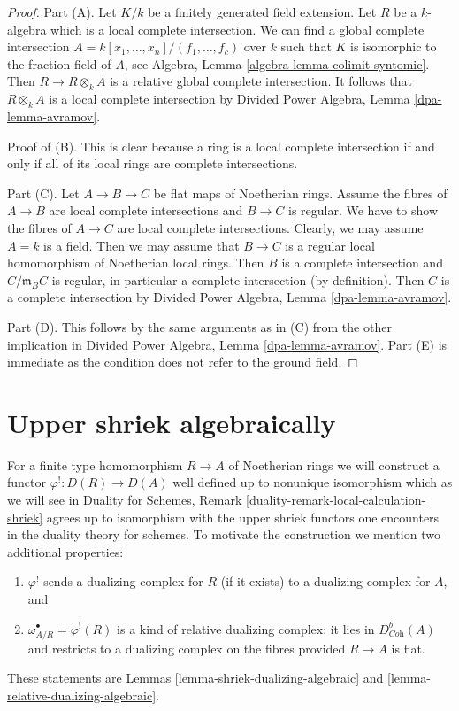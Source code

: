 \documentclass{stacks-project}
\theoremstyle{plain}
\theoremstyle{definition}
\theoremstyle{remark}
\numberwithin{equation}{subsection}
\begin{document}
\begin{proof}
Part (A). Let $K/k$ be a finitely generated field extension.
Let $R$ be a $k$-algebra which is a local complete intersection.
We can find a global complete intersection
$A = k[x_1, \ldots, x_n]/(f_1, \ldots, f_c)$
over $k$ such that $K$ is isomorphic to the fraction field of $A$, see
Algebra, Lemma \ref{algebra-lemma-colimit-syntomic}.
Then $R \to R \otimes_k A$ is a relative global complete intersection.
It follows that $R \otimes_k A$ is a local complete intersection
by Divided Power Algebra, Lemma \ref{dpa-lemma-avramov}.

\medskip\noindent
Proof of (B). This is clear
because a ring is a local complete intersection if and only if all of its
local rings are complete intersections.

\medskip\noindent
Part (C). Let $A \to B \to C$ be flat maps of Noetherian rings.
Assume the fibres of $A \to B$ are local complete intersections
and $B \to C$ is regular. We have to show the fibres of $A \to C$
are local complete intersections. Clearly, we may assume $A = k$ is a field.
Then we may assume that $B \to C$ is a regular local homomorphism
of Noetherian local rings. Then $B$ is a complete intersection and
$C/\mathfrak m_B C$ is regular, in particular a complete intersection
(by definition). Then $C$ is a complete intersection by
Divided Power Algebra, Lemma \ref{dpa-lemma-avramov}.

\medskip\noindent
Part (D). This follows by the same arguments as in (C) from
the other implication in
Divided Power Algebra, Lemma \ref{dpa-lemma-avramov}.
Part (E) is immediate as the condition does not refer to the ground
field.
\end{proof}






\section{Upper shriek algebraically}
\label{section-relative-dualizing-complex-algebraic}

\noindent
For a finite type homomorphism $R \to A$ of Noetherian rings
we will construct a functor $\varphi^! : D(R) \to D(A)$
well defined up to nonunique isomorphism which
as we will see in Duality for Schemes, Remark
\ref{duality-remark-local-calculation-shriek}
agrees up to isomorphism with the upper shriek functors
one encounters in the duality theory for schemes.
To motivate the construction we mention two additional properties:
\begin{enumerate}
\item $\varphi^!$ sends a dualizing complex for $R$ (if it exists)
to a dualizing complex for $A$, and
\item $\omega_{A/R}^\bullet = \varphi^!(R)$ is a kind of
relative dualizing complex: it lies in $D^b_{\textit{Coh}}(A)$ and restricts
to a dualizing complex on the fibres provided $R \to A$ is flat.
\end{enumerate}
These statements are Lemmas \ref{lemma-shriek-dualizing-algebraic} and
\ref{lemma-relative-dualizing-algebraic}.
\end{document}
